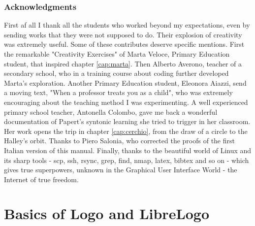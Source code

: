 \tableofcontents
\newpage

\section{Acknowledgments}

First af all I thank all the students who worked beyond my expectations, even by sending works that they were not supposed to do. Their explosion of creativity was extremely useful. Some of these contributes deserve specific mentions. First the remarkable "Creativity Exercises" of Marta Veloce, Primary Education student, that inspired chapter \ref{cap:marta}. Then Alberto Averono, teacher of a secondary school, who in a training course about coding further developed Marta's exploration. Another Primary Education student, Eleonora Aiazzi, send a moving text, "When a professor treats you as a child", who was extremely encouraging about the teaching method I was experimenting. A well experienced primary school teacher, Antonella Colombo, gave me back a wonderful documentation of Papert's syntonic learning she tried to trigger in her classroom. Her work opens the trip in chapter \ref{cap:cerchio}, from the draw of a circle to the Halley's orbit. Thanks to Piero Salonia, who corrected the proofs of the first Italian version of this manual. Finally, thanks to the beautiful world of Linux and its sharp tools  - scp, ssh, rsync, grep, find, nmap, latex, bibtex and so on - which gives true superpowers, unknown in the Graphical User Interface World - the Internet of true freedom.

\part{Basics of Logo and LibreLogo} \label{parte:manuale}


